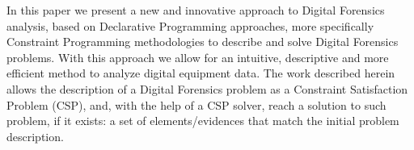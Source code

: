 \begin{tueABSTRACT}
In this paper we present a new and innovative approach to Digital Forensics analysis, based on Declarative Programming approaches, more specifically Constraint Programming methodologies to describe and solve Digital Forensics problems. With this approach we allow for an intuitive, descriptive and more efficient method to analyze digital equipment data.
The work described herein allows the description of a Digital Forensics problem as a Constraint Satisfaction Problem (CSP), and, with the help of a CSP solver, reach a solution to such problem, if it exists: a set of elements/evidences that match the initial problem description.
\end{tueABSTRACT}

